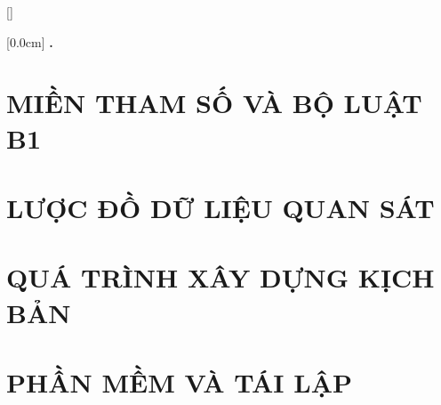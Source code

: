 \documentclass[a4paper,13pt,3p,twoside]{report}
\renewcommand{\_}{\gachduoi\allowbreak}
\theoremstyle{definition}
\begin{document}
\newpage
\renewcommand\bibname{TÀI LIỆU THAM KHẢO}
\printbibliography[heading=bibintoc] %

\newpage
{}\addappheadtotoc %
\appendixpage
\appendix

[]
\titlespacing*{\chapter}{0pt}{-20pt}{20pt}

    [0.0cm]             %
    {\bfseries\vspace{0.3cm}}                  %
    {{\bfseries{\scshape} \thecontentslabel.\ }} %
    {}         %
    {\contentspage}

\chapter{MIỀN THAM SỐ VÀ BỘ LUẬT B1}


\newpage
\chapter{LƯỢC ĐỒ DỮ LIỆU QUAN SÁT}


\newpage
\chapter{QUÁ TRÌNH XÂY DỰNG KỊCH BẢN}
\label{appendix:history}


\newpage
\chapter{PHẦN MỀM VÀ TÁI LẬP}
\label{appendix:software}

\end{document}
